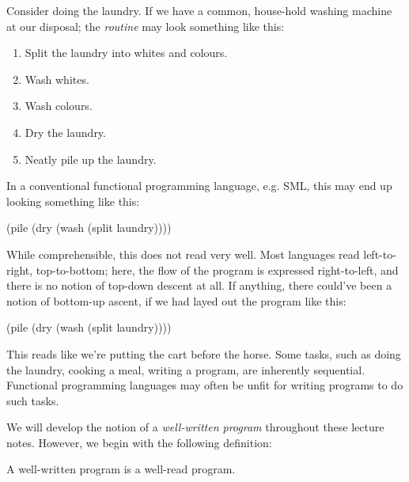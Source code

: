 Consider doing the laundry. If we have a common, house-hold washing machine at
our disposal; the \emph{routine} may look something like this:

\begin{enumerate}

\item Split the laundry into whites and colours.

\item Wash whites.

\item Wash colours.

\item Dry the laundry.

\item Neatly pile up the laundry.

\end{enumerate}

In a conventional functional programming language, e.g. SML, this may end up
looking something like this:

\begin{code}
(pile (dry (wash (split laundry))))
\end{code}

While comprehensible, this does not read very well. Most
 languages read left-to-right,
top-to-bottom; here, the flow of the program is expressed right-to-left, and
there is no notion of top-down descent at all. If anything, there could've been
a notion of bottom-up ascent, if we had layed out the program like this:

\begin{code}
(pile
  (dry
    (wash
      (split laundry))))
\end{code}

This reads like we're putting the cart before the horse. Some tasks, such as
doing the laundry, cooking a meal, writing a program, are inherently
sequential. Functional programming languages may often be
 unfit for writing programs to
do such tasks.

We will develop the notion of a \emph{well-written program} throughout these
lecture notes. However, we begin with the following definition:

\begin{definition}
A well-written program is a well-read program.
\end{definition}

